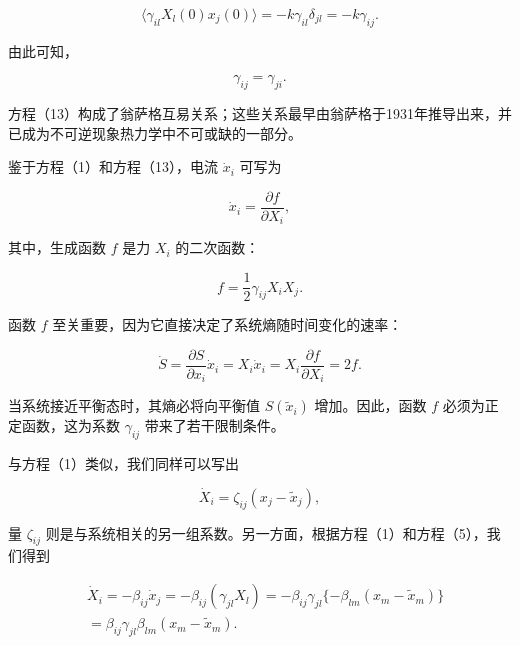 \begin{equation}\tag{15.6.40}\label{eq:15.6.40}
\langle \gamma _ { i l } X _ { l } ( 0 ) x _ { j } ( 0 ) \rangle = - k \gamma _ { i l } \delta _ { j l } = - k \gamma _ { i j } .
\end{equation}

由此可知，

\begin{equation}\tag{15.6.41}\label{eq:15.6.41}
\gamma _ { i j } = \gamma _ { j i } .
\end{equation}

方程（13）构成了翁萨格互易关系；这些关系最早由翁萨格于1931年推导出来，并已成为不可逆现象热力学中不可或缺的一部分。

鉴于方程（1）和方程（13），电流 \(\dot{x}_{i}\) 可写为

\begin{equation}\tag{15.6.42}\label{eq:15.6.42}
\dot { x } _ { i } = \frac { \partial f } { \partial X _ { i } } ,
\end{equation}

其中，生成函数 \(f\) 是力 \(X_i\) 的二次函数：

\begin{equation}\tag{15.6.43}\label{eq:15.6.43}
f = \frac { 1 } { 2 } \gamma _ { i j } X _ { i } X _ { j } .
\end{equation}

函数 \(f\) 至关重要，因为它直接决定了系统熵随时间变化的速率：

\begin{equation}\tag{15.6.44}\label{eq:15.6.44}
\dot { S } = \frac { \partial S } { \partial x _ { i } } \dot { x } _ { i } = X _ { i } \dot { x } _ { i } = X _ { i } \frac { \partial f } { \partial X _ { i } } = 2 f .
\end{equation}

当系统接近平衡态时，其熵必将向平衡值 \(S(\tilde{x}_i)\) 增加。因此，函数 \(f\) 必须为正定函数，这为系数 \(\gamma_{ij}\) 带来了若干限制条件。

与方程（1）类似，我们同样可以写出

\begin{equation}\tag{15.6.45}\label{eq:15.6.45}
\dot { X } _ { i } = \zeta _ { i j } ( x _ { j } - \tilde { x } _ { j } ) ,
\end{equation}

量 \(\zeta_{ij}\) 则是与系统相关的另一组系数。另一方面，根据方程（1）和方程（5），我们得到

\begin{equation}\tag{15.6.46}\label{eq:15.6.46}
\begin{array}{rl} & { \dot { X } _ { i } = - \beta _ { i j } \dot { x } _ { j } = - \beta _ { i j } ( \gamma _ { j l } X _ { l } ) = - \beta _ { i j } \gamma _ { j l } \{ - \beta _ { l m } ( x _ { m } - \tilde { x } _ { m } ) \} } \\& { = \beta _ { i j } \gamma _ { j l } \beta _ { l m } ( x _ { m } - \tilde { x } _ { m } ) . } \end{array}
\end{equation}


